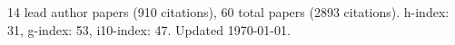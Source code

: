 14 lead author papers (910 citations),
60 total papers (2893 citations).\newline
h-index: 31, g-index: 53, i10-index: 47. Updated \today.